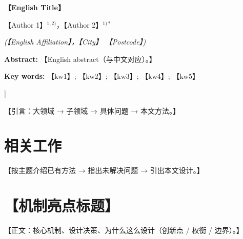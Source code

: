 \documentclass[twocolumn,10pt]{ctexart}
\let\heiti\heifamily
\begin{document}
\begin{center}
  {\bfseries\fontsize{13.5}{18}\selectfont 【English Title】}\par
  \vspace{5pt}
  {\normalsize 【Author 1】$^{1,2)}$，【Author 2】$^{1)*}$}\par
  \vspace{3pt}
  {\small\itshape (【English Affiliation】，【City】 【Postcode】)}\par
  \vspace{6pt}
\end{center}
\begin{flushleft}
  {\bfseries Abstract:} {\small 【English abstract（与中文对应）。】}\par
  \vspace{3pt}
  {\bfseries Key words:} {\small 【kw1】; 【kw2】; 【kw3】; 【kw4】; 【kw5】}\par
\end{flushleft}
]%


【引言：大领域 → 子领域 → 具体问题 → 本文方法。】\cite{ref1}

\section{\heiti\fontsize{11.5}{15}\selectfont 相关工作}
【按主题介绍已有方法 → 指出未解决问题 → 引出本文设计。】

\section{\heiti\fontsize{11.5}{15}\selectfont 【机制亮点标题】}
【正文：核心机制、设计决策、为什么这么设计（创新点 / 权衡 / 边界）。】
\end{document}

